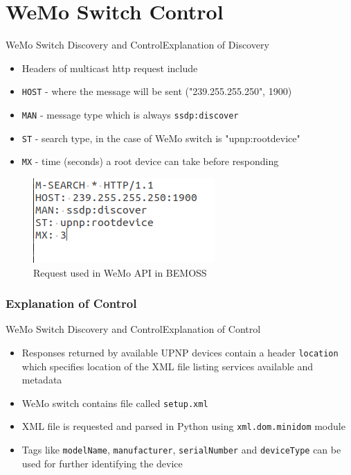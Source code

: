 \documentclass{beamer}
\begin{document}
\section{WeMo Switch Control}
\begin{frame}{WeMo Switch Discovery and Control}{Explanation of Discovery}
\begin{itemize}
\item Headers of multicast http request include
\item \texttt{HOST} - where the message will be sent ("239.255.255.250", 1900)
\item \texttt{MAN} - message type which is always \texttt{ssdp:discover}
\item \texttt{ST} - search type, in the case of WeMo switch is "upnp:rootdevice"
\item \texttt{MX} - time (seconds) a root device can take before responding
\end{itemize}
\begin{figure}
\includegraphics[scale=0.5]{../figs/img/upnpRequest}
\caption{Request used in WeMo API in BEMOSS}
\end{figure}
\end{frame}

\subsubsection{Explanation of Control}
\begin{frame}{WeMo Switch Discovery and Control}{Explanation of Control}
\begin{itemize}
\item Responses returned by available UPNP devices contain a header \texttt{location} which specifies location of the XML file listing services available and metadata
\item WeMo switch contains file called \texttt{setup.xml}
\item XML file is requested and parsed in Python using \texttt{xml.dom.minidom} module
\item Tags like \texttt{modelName}, \texttt{manufacturer}, \texttt{serialNumber} and \texttt{deviceType} can be used for further identifying the device
\end{itemize}
\end{frame}
\end{document}
